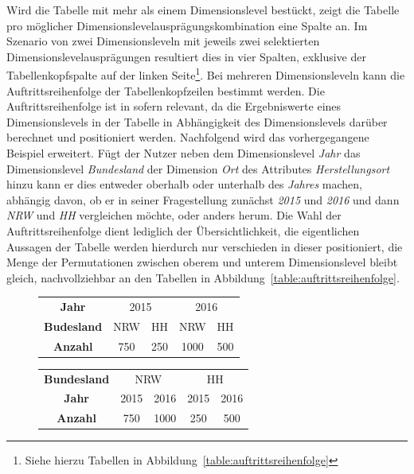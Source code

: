 \documentclass[
  language=german, %
  type=bachelor%
]{isthesis}
\begin{document}
\begin{content}
  Wird die Tabelle mit mehr als einem Dimensionslevel bestückt, zeigt die
  Tabelle pro möglicher Dimensionslevelausprägungskombination eine Spalte an.
  Im Szenario von zwei Dimensionsleveln mit jeweils zwei selektierten
  Dimensionslevelausprägungen resultiert dies in vier Spalten, exklusive der
  Tabellenkopfspalte auf der linken Seite\footnote{Siehe hierzu Tabellen in
  Abbildung~\ref{table:auftrittsreihenfolge}}. Bei mehreren Dimensionsleveln
  kann die Auftrittsreihenfolge der Tabellenkopfzeilen bestimmt werden. Die
  Auftrittsreihenfolge ist in sofern relevant, da die Ergebniswerte eines
  Dimensionslevels in der Tabelle in Abhängigkeit des Dimensionslevels darüber
  berechnet und positioniert werden. Nachfolgend wird das vorhergegangene
  Beispiel erweitert. Fügt der Nutzer neben dem Dimensionslevel \textit{Jahr}
  das Dimensionslevel \textit{Bundesland} der Dimension \textit{Ort} des
  Attributes \textit{Herstellungsort} hinzu kann er dies entweder oberhalb oder
  unterhalb des \textit{Jahres} machen, abhängig davon, ob er in seiner
  Fragestellung zunächst \textit{2015} und \textit{2016} und dann \textit{NRW}
  und \textit{HH} vergleichen möchte, oder anders herum. Die Wahl der
  Auftrittsreihenfolge dient lediglich der Übersichtlichkeit, die eigentlichen
  Aussagen der Tabelle werden hierdurch nur verschieden in dieser positioniert,
  die Menge der Permutationen zwischen oberem und unterem Dimensionslevel
  bleibt gleich, nachvollziehbar an den Tabellen in
  Abbildung~\ref{table:auftrittsreihenfolge}.
  
  \begin{figure}[caption={Auswertung des Geschäftsobjets \textit{Produkt}}, label={table:auftrittsreihenfolge}]
    \footnotesize
    \begin{tabular}{c c c c c}
      \textbf{Jahr} & \multicolumn{2}{c}{2015} & \multicolumn{2}{c}{2016} \\
      \textbf{Budesland} & NRW & HH & NRW & HH \\
      \toprule
      \textbf{Anzahl} & 750 & 250 & 1000 & 500\\
    \end{tabular}
    \begin{tabular}{c c c c c}
      \textbf{Bundesland} & \multicolumn{2}{c}{NRW} & \multicolumn{2}{c}{HH} \\
      \textbf{Jahr} & 2015 & 2016 & 2015 & 2016 \\
      \toprule
      \textbf{Anzahl} & 750 & 1000 & 250 & 500 \\
    \end{tabular}
  \end{figure}


\end{content}
\end{document}
